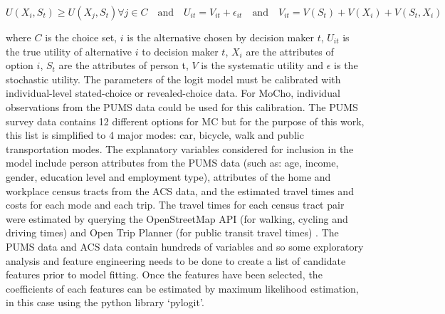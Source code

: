 {{        \begin{equation}\label{dcm}
            U(X_i, S_t)\geq U(X_j, S_t) \forall j \in C
            \quad \text{and}\quad
            U_{it}=V_{it} + \epsilon_{it}
            \quad \text{and}\quad
            V_{it}=V(S_t)+V(X_i)+V(S_t,X_i)
        \end{equation}

        where $C$ is the choice set, $i$ is the alternative chosen by decision maker $t$,  $U_{it}$ is the true utility of alternative $i$ to decision maker $t$, $X_i$ are the attributes of option $i$, $S_t$ are the attributes of person t, $V$ is the systematic utility and $\epsilon$ is the stochastic utility.
        \newline
        The parameters of the logit model must be calibrated with individual-level stated-choice or revealed-choice data. For MoCho, individual observations from the PUMS data could be used for this calibration. The PUMS survey data contains 12 different options for MC but for the purpose of this work, this list is simplified to 4 major modes: car, bicycle, walk and public transportation modes. The explanatory variables considered for inclusion in the model include person attributes from the PUMS data (such as: age, income, gender, education level and employment type), attributes of the home and workplace census tracts from the ACS data, and the estimated travel times and costs for each mode and each trip. The travel times for each census tract pair were estimated by querying the OpenStreetMap API (for walking, cycling and driving times) and Open Trip Planner (for public transit travel times) \cite{OTP}. The PUMS data and ACS data contain hundreds of variables and so some exploratory analysis and feature engineering needs to be done to create a list of candidate features prior to model fitting. Once the features have been selected, the coefficients of each features can be estimated by maximum likelihood estimation, in this case using the python library `pylogit'.
    }


}
